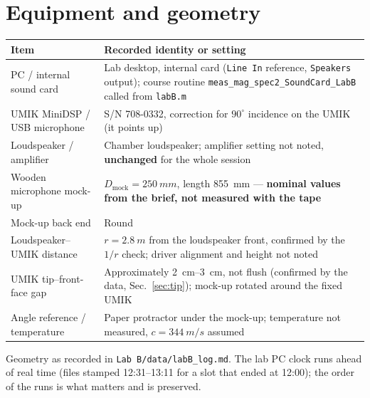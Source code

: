 \documentclass[a4paper,10pt]{article}
\newcommand{\file}[1]{\nolinkurl{#1}}
\begin{document}
\section{Equipment and geometry}
\par\smallskip
\begin{tabularx}{\linewidth}{@{}lX@{}}\toprule
Item & Recorded identity or setting \\\midrule
PC / internal sound card & Lab desktop, internal card (\texttt{Line In} reference, \file{Speakers} output); course routine \file{meas_mag_spec2_SoundCard_LabB} called from \file{labB.m} \\
UMIK MiniDSP / USB microphone & S/N 708-0332, correction for $90^\circ$ incidence on the UMIK (it points up) \\
Loudspeaker / amplifier & Chamber loudspeaker; amplifier setting not noted, \textbf{unchanged} for the whole session \\
Wooden microphone mock-up & $D_{\mathrm{mock}}=\SI{250}{mm}$, length \SI{855}{mm} --- \textbf{nominal values from the brief, not measured with the tape} \\
Mock-up back end & Round \\
Loudspeaker--UMIK distance & $r=\SI{2.8}{m}$ from the loudspeaker front, confirmed by the $1/r$ check; driver alignment and height not noted \\
UMIK tip--front-face gap & Approximately \SIrange{2}{3}{cm}, not flush (confirmed by the data, Sec.~\ref{sec:tip}); mock-up rotated around the fixed UMIK \\
Angle reference / temperature & Paper protractor under the mock-up; temperature not measured, $c=\SI{344}{m/s}$ assumed \\\bottomrule
\end{tabularx}\par\smallskip
Geometry as recorded in \file{Lab B/data/labB_log.md}. The lab PC clock runs ahead of
real time (files stamped 12:31--13:11 for a slot that ended at 12:00); the order of
the runs is what matters and is preserved.
\end{document}
